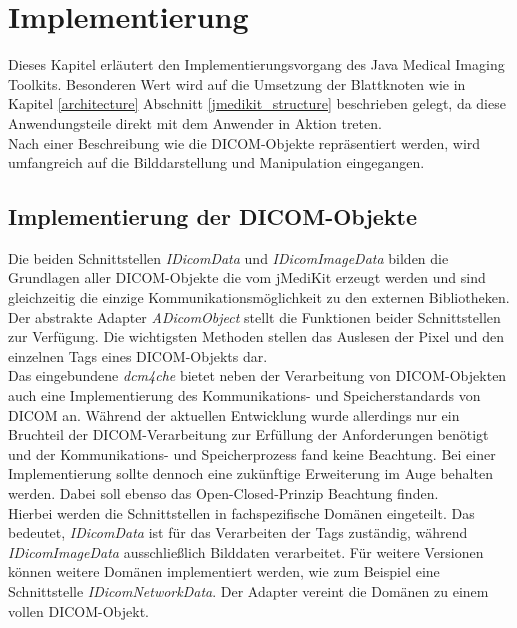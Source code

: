 \chapter{Implementierung} \label{implementation}

Dieses Kapitel erläutert den Implementierungsvorgang des Java Medical Imaging Toolkits. Besonderen Wert wird auf die Umsetzung der Blattknoten wie in Kapitel \ref{architecture} Abschnitt \ref{jmedikit_structure} beschrieben gelegt, da diese Anwendungsteile direkt mit dem Anwender in Aktion treten.\\
Nach einer Beschreibung wie die DICOM-Objekte repräsentiert werden, wird umfangreich auf die Bilddarstellung und Manipulation eingegangen.

\FloatBarrier
\section{Implementierung der DICOM-Objekte}

Die beiden Schnittstellen \textit{IDicomData} und \textit{IDicomImageData} bilden die Grundlagen aller DICOM-Objekte die vom jMediKit erzeugt werden und sind gleichzeitig die einzige Kommunikationsmöglichkeit zu den externen Bibliotheken. Der abstrakte Adapter \textit{ADicomObject} stellt die Funktionen beider Schnittstellen zur Verfügung. Die wichtigsten Methoden stellen das Auslesen der Pixel und den einzelnen Tags eines DICOM-Objekts dar. \\
Das eingebundene \textit{dcm4che} bietet neben der Verarbeitung von DICOM-Objekten auch eine Implementierung des Kommunikations- und Speicherstandards von DICOM an. Während der aktuellen Entwicklung wurde allerdings nur ein Bruchteil der DICOM-Verarbeitung zur Erfüllung der Anforderungen benötigt und der Kommunikations- und Speicherprozess fand keine Beachtung. Bei einer Implementierung sollte dennoch eine zukünftige Erweiterung im Auge behalten werden. Dabei soll ebenso das Open-Closed-Prinzip Beachtung finden.\\
Hierbei werden die Schnittstellen in fachspezifische Domänen eingeteilt. Das bedeutet, \textit{IDicomData} ist für das Verarbeiten der Tags zuständig, während \textit{IDicomImageData} ausschließlich Bilddaten verarbeitet. Für weitere Versionen können weitere Domänen implementiert werden, wie zum Beispiel eine Schnittstelle \textit{IDicomNetworkData}. Der Adapter vereint die Domänen zu einem vollen DICOM-Objekt. 

